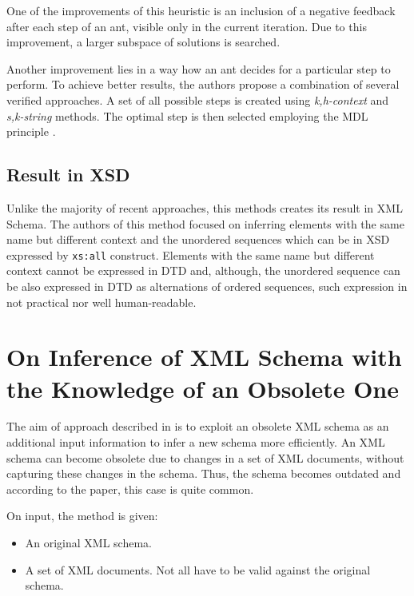 One of the improvements of this heuristic is an inclusion of a negative feedback after each step of an ant, visible only in the current iteration. Due to this improvement, a larger subspace of solutions is searched.

Another improvement lies in a way how an ant decides for a particular step to perform. To achieve better results, the authors propose a combination of several verified approaches. A set of all possible steps is created using \emph{k,h-context} \cite{ahonen} and \emph{s,k-string} \cite{Raman97thesk-strings, Wong03onstructural} methods. The optimal step is then selected employing the MDL principle \cite{Grünwald05atutorial, Garofalakis:2000:XSE:342009.335409}.

\subsection{Result in XSD}
Unlike the majority of recent approaches, this methods creates its result in XML Schema. The authors of this method focused on inferring elements with the same name but different context and the unordered sequences which can be in XSD expressed by \texttt{xs:all} construct. Elements with the same name but different context cannot be expressed in DTD and, although, the unordered sequence can be also expressed in DTD as alternations of ordered sequences, such expression in not practical nor well human-readable.

\section[On Inference of XML Schema with the Knowledge of an Obs. One]{On Inference of XML Schema with the Knowledge of an Obsolete One}
The aim of approach described in \cite{Mlynkova:2009:IXS:1862681.1862693} is to exploit an obsolete XML schema as an additional input information to infer a new schema more efficiently. An XML schema can become obsolete due to changes in a set of XML documents, without capturing these changes in the schema. Thus, the schema becomes outdated and according to the paper, this case is quite common.

On input, the method is given:
\begin{itemize}
\item An original XML schema.
\item A set of XML documents. Not all have to be valid against the original schema.
\end{itemize}

